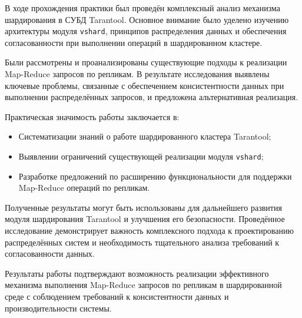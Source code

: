 \conclusion

В ходе прохождения практики был проведён комплексный анализ механизма
шардирования в СУБД Tarantool. Основное внимание было уделено изучению
архитектуры модуля \texttt{vshard}, принципов распределения данных и
обеспечения согласованности при выполнении операций в шардированном кластере.

Были рассмотрены и проанализированы существующие подходы к реализации
Map-Reduce запросов по репликам. В результате исследования выявлены ключевые
проблемы, связанные с обеспечением консистентности данных при выполнении
распределённых запросов, и предложена альтернативная реализация.

Практическая значимость работы заключается в:
\begin{itemize}
    \item Систематизации знаний о работе шардированного кластера Tarantool;
    \item Выявлении ограничений существующей реализации модуля \texttt{vshard};
    \item Разработке предложений по расширению функциональности для поддержки
        Map-Reduce операций по репликам.
\end{itemize}

Полученные результаты могут быть использованы для дальнейшего развития модуля
шардирования Tarantool и улучшения его безопасности. Проведённое исследование
демонстрирует важность комплексного подхода к проектированию распределённых
систем и необходимость тщательного анализа требований к согласованности данных.

Результаты работы подтверждают возможность реализации эффективного механизма
выполнения Map-Reduce запросов по репликам в шардированной среде с соблюдением
требований к консистентности данных и производительности системы.
